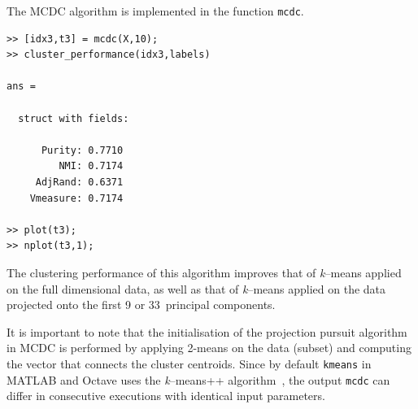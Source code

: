 \documentclass{book}
\begin{document}
The MCDC algorithm is implemented in the function {\tt mcdc}.


\begin{lstlisting}
>> [idx3,t3] = mcdc(X,10);
>> cluster_performance(idx3,labels)

ans = 

  struct with fields:

      Purity: 0.7710
         NMI: 0.7174
     AdjRand: 0.6371
    Vmeasure: 0.7174

>> plot(t3);
>> nplot(t3,1);
\end{lstlisting}


\noindent
%
The clustering performance of this algorithm improves that of {\it k}--means applied
on the full dimensional data, as well as that of {\it k}--means applied on
the data projected onto the first 9 or 33~principal components.

It is important to note
that the initialisation of the projection pursuit algorithm in MCDC is performed by
applying 2-means on the data (subset) and computing the vector that connects
the cluster centroids. Since by default {\tt kmeans} in MATLAB
and Octave uses the {\it k}--means++ algorithm~\cite{ArthurV2007}, 
the output {\tt mcdc} can differ in consecutive executions with
identical input parameters.
\end{document}
